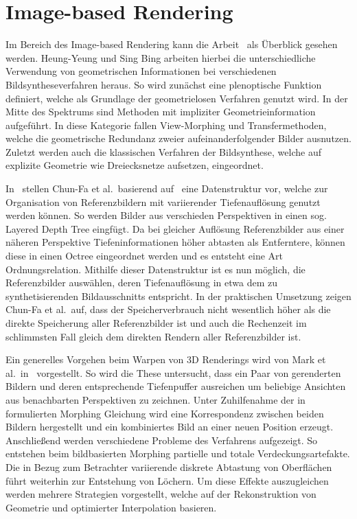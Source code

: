 \documentclass[hyperref, beleg, german]{cgvpub}
\begin{document}
\section{Image-based Rendering}

Im Bereich des Image-based Rendering kann die Arbeit~\cite{shum2000review} als
Überblick gesehen werden. Heung-Yeung und Sing Bing arbeiten hierbei die
unterschiedliche Verwendung von geometrischen Informationen bei verschiedenen
Bildsyntheseverfahren heraus. So wird zunächst eine plenoptische Funktion
definiert, welche als Grundlage der geometrielosen Verfahren genutzt wird. In
der Mitte des Spektrums sind Methoden mit impliziter Geometrieinformation
aufgeführt. In diese Kategorie fallen View-Morphing und Transfermethoden,
welche die geometrische Redundanz zweier aufeinanderfolgender Bilder ausnutzen.
Zuletzt werden auch die klassischen Verfahren der Bildsynthese, welche auf
explizite Geometrie wie Dreiecksnetze aufsetzen, eingeordnet.

In~\cite{chang1999ldi} stellen Chun-Fa et al.\ basierend auf~\cite{he1998layered}
eine Datenstruktur vor, welche zur Organisation von Referenzbildern mit
variierender Tiefenauflösung genutzt werden können. So werden Bilder aus
verschieden Perspektiven in einen sog. Layered Depth Tree eingfügt. Da bei
gleicher Auflösung Referenzbilder aus einer näheren Perspektive
Tiefeninformationen höher abtasten als Entferntere, können diese in einen Octree
eingeordnet werden und es entsteht eine Art Ordnungsrelation. Mithilfe dieser
Datenstruktur ist es nun möglich, die Referenzbilder auswählen, deren
Tiefenauflösung in etwa dem zu synthetisierenden Bildausschnitts entspricht. In
der praktischen Umsetzung zeigen Chun-Fa et al.\ auf, dass der Speicherverbrauch
nicht wesentlich höher als die direkte Speicherung aller Referenzbilder ist und
auch die Rechenzeit im schlimmsten Fall gleich dem direkten Rendern aller
Referenzbilder ist.

Ein generelles Vorgehen beim Warpen von 3D Renderings wird von Mark et al.\
in~\cite{mark1997post} vorgestellt. So wird die These untersucht, dass ein Paar
von gerenderten Bildern und deren entsprechende Tiefenpuffer ausreichen um
beliebige Ansichten aus benachbarten Perspektiven zu zeichnen. Unter
Zuhilfenahme der in~\cite{mcmillan1995head} formulierten Morphing Gleichung
wird eine Korrespondenz zwischen beiden Bildern hergestellt und ein
kombiniertes Bild an einer neuen Position erzeugt. Anschließend werden
verschiedene Probleme des Verfahrens aufgezeigt. So entstehen beim
bildbasierten Morphing partielle und totale Verdeckungsartefakte. Die in Bezug
zum Betrachter variierende diskrete Abtastung von Oberflächen führt weiterhin
zur Entstehung von Löchern. Um diese Effekte auszugleichen werden mehrere
Strategien vorgestellt, welche auf der Rekonstruktion von Geometrie und
optimierter Interpolation basieren.
\end{document}
